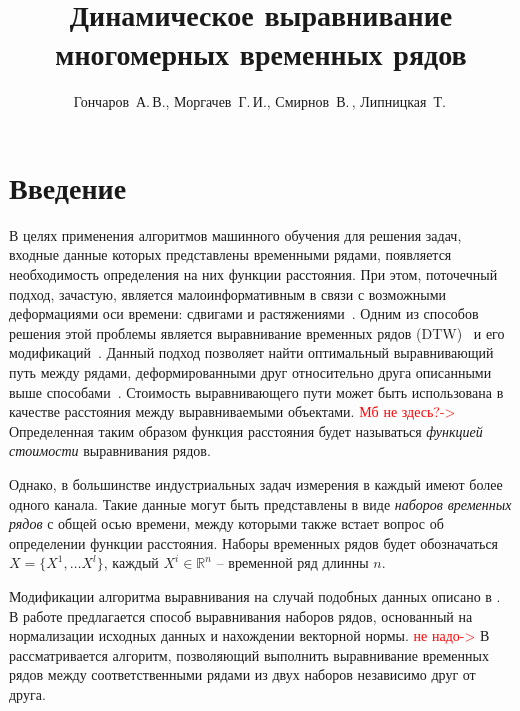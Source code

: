 \documentclass[12pt,twoside]{article}
\title
        {Динамическое выравнивание многомерных временных рядов}
\author
        {Гончаров~А.\,В., Моргачев~Г.\,И., Смирнов~В.\,, Липницкая~Т.\,} %
\newcommand{\fixme}[1]{\textcolor{red}{#1}}
\begin{document}
    \maketitle
    \setcounter{secnumdepth}{3}
    \section{Введение}\label{intro}
        
        В целях применения алгоритмов машинного обучения для решения задач, входные данные которых представлены временными рядами, появляется необходимость определения на них функции расстояния. При этом, поточечный подход, зачастую, является малоинформативным в связи с возможными деформациями оси времени: сдвигами и растяжениями~\cite{01f4ab11a9ff49ff909094a135dcfe33}.
        Одним из способов решения этой проблемы является выравнивание временных рядов (DTW)~\cite{Keogh:1999:SUD:645803.669511} и его модификаций~\cite{journals/ida/SalvadorC07,Keogh01derivativedynamic}.
        Данный подход позволяет найти оптимальный выравнивающий путь между рядами, деформированными друг относительно друга описанными выше способами~\cite{salvador2004fastdtw}. Стоимость выравнивающего пути может быть использована в качестве расстояния между выравниваемыми объектами. \fixme{Мб не здесь?->} Определенная таким образом функция расстояния будет называться \textit{функцией стоимости} выравнивания рядов.
        
        Однако, в большинстве индустриальных задач измерения в каждый имеют более одного канала. Такие данные могут быть представлены в виде \textit{наборов временных рядов} с общей осью времени, между которыми также встает вопрос об определении функции расстояния. Наборы временных рядов будет обозначаться $X = \{X^1,\dots X^l\}$, каждый $X^i \in \mathbb{R}^{n}$ \--- временной ряд длинны $n$.
        
        Модификации алгоритма выравнивания на случай подобных данных описано в \cite{Holt2007,Sanguansat2012MultipleMS}.
        В работе \cite{Holt2007} предлагается способ выравнивания наборов рядов, основанный на нормализации исходных данных и нахождении векторной нормы.
        \fixme{не надо->} В \cite{Sanguansat2012MultipleMS} рассматривается алгоритм, позволяющий выполнить выравнивание временных рядов между соответственными рядами из двух наборов независимо друг от друга.
        
\end{document}
